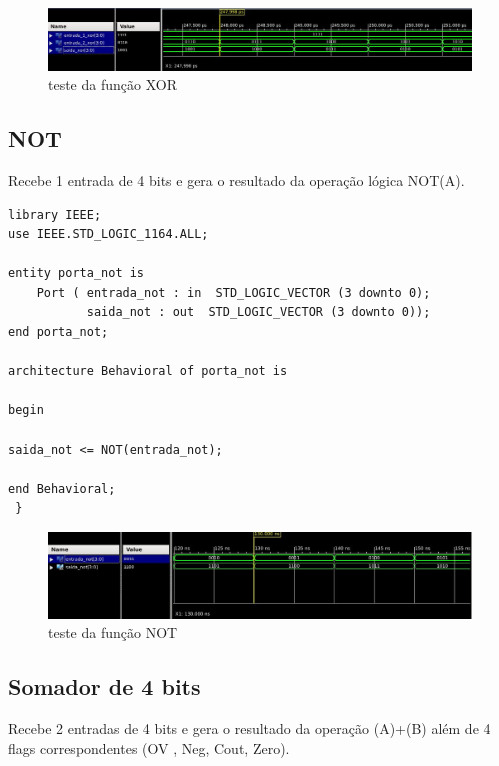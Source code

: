 \documentclass[a4paper,12pt,twoside]{article}
\begin{document}
   \begin{figure}[H]
\centering
\includegraphics[scale=0.55]{testes/xor2.jpeg}
\caption{teste da função XOR}
\label{fig:diagrama}
\end{figure}

\subsection{NOT}
Recebe 1 entrada de 4 bits e gera o resultado da operação lógica NOT(A).

\begin{lstlisting}
library IEEE;
use IEEE.STD_LOGIC_1164.ALL;

entity porta_not is
    Port ( entrada_not : in  STD_LOGIC_VECTOR (3 downto 0);
           saida_not : out  STD_LOGIC_VECTOR (3 downto 0));
end porta_not;

architecture Behavioral of porta_not is

begin

saida_not <= NOT(entrada_not);

end Behavioral;
 } \end{lstlisting}
   \begin{figure}[H]
\centering
\includegraphics[scale=0.6]{testes/NOT2.jpeg}
\caption{teste da função NOT}
\label{fig:diagrama}
\end{figure}

\subsection{Somador de 4 bits}
Recebe 2 entradas de 4 bits e gera o resultado da operação  (A)+(B) além de 4 flags  correspondentes (OV , Neg, Cout, Zero).
\end{document}
